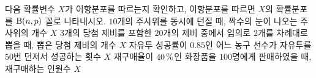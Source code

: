 다음 확률변수 $X$가 이항분포를 따르는지 확인하고, 이항분포를 따르면 $X$의 확률분포를 $\mathrm{B}(n{,}\mkern3mu\mathopen{}p)$ 꼴로 나타내시오.
 $10$개의 주사위를 동시에 던질 때, 짝수의 눈이 나오는 주사위의 개수 $X$
 $3$개의 당첨 제비를 포함한 $20$개의 제비 중에서 임의로 $2$개를 차례대로 뽑을 때, 뽑은 당첨 제비의 개수 $X$ 
 자유투 성공률이 $0.85$인 어느 농구 선수가 자유투를 $50$번 던져서 성공하는 횟수 $X$
 재구매율이 $40\mkern3mu \%$인 화장품을 $100$명에게 판매하였을 때, 재구매하는 인원수 $X$
